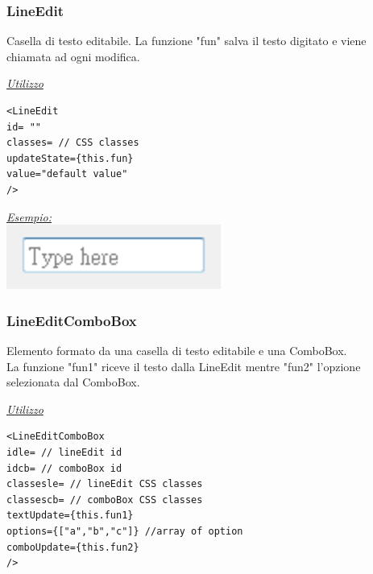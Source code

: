 \subsubsection{LineEdit}
Casella di testo editabile. La funzione "fun" salva il testo digitato e viene chiamata ad ogni modifica.
\begin{center}
\underline{\textit{Utilizzo}}
\begin{lstlisting}
<LineEdit
id= ""
classes= // CSS classes
updateState={this.fun}
value="default value"
/>
\end{lstlisting}
\underline{\textit{Esempio:}}
\\
\includegraphics[scale=1]{img/lineedit.png}
\\
\end{center}

\subsubsection{LineEditComboBox}
Elemento formato da una casella di testo editabile e una ComboBox.\\
La funzione "fun1" riceve il testo dalla LineEdit mentre "fun2" l'opzione selezionata dal ComboBox.
\begin{center}
\underline{\textit{Utilizzo}}
\begin{lstlisting}
<LineEditComboBox
idle= // lineEdit id
idcb= // comboBox id
classesle= // lineEdit CSS classes
classescb= // comboBox CSS classes
textUpdate={this.fun1}
options={["a","b","c"]} //array of option
comboUpdate={this.fun2}
/>
\end{lstlisting}
\end{center}

